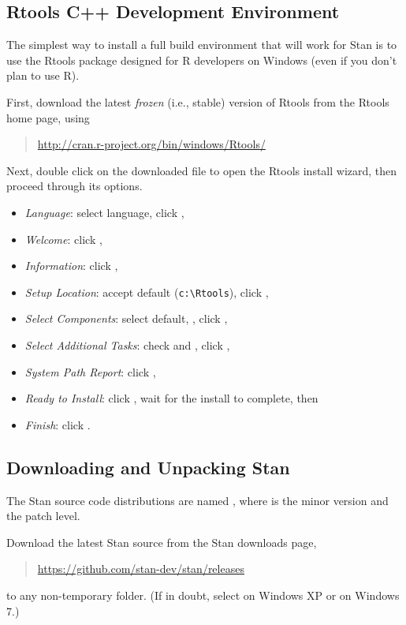 \subsection{Rtools C++ Development Environment}

The simplest way to install a full \Cpp build environment that will
work for Stan is to use the Rtools package designed for R developers
on Windows (even if you don't plan to use R).

First, download the latest \emph{frozen} (i.e., stable) version of
Rtools from the Rtools home page, using
%
\begin{quote}
\url{http://cran.r-project.org/bin/windows/Rtools/}
\end{quote}

Next, double click on the downloaded file to open the Rtools
install wizard, then proceed through its options.
\begin{itemize}
\item \emph{Language}: select language, click ,
\item \emph{Welcome}: click ,
\item \emph{Information}: click ,
\item \emph{Setup Location}: accept default (\verb|c:\Rtools|), click ,
\item \emph{Select Components}: select default, , click ,
\item \emph{Select Additional Tasks}: check  and , click ,
\item \emph{System Path Report}: click ,
\item \emph{Ready to Install}: click , wait for the
  install to complete, then
\item \emph{Finish}: click .
\end{itemize}

\subsection{Downloading and Unpacking Stan}

The Stan source code distributions are named
, where  is the minor version and
 the patch level.

Download the latest Stan source from the Stan downloads page,
%
\begin{quote}
\url{https://github.com/stan-dev/stan/releases}
\end{quote}
%
to any non-temporary folder.  (If in doubt, select 
on Windows XP or  on Windows 7.)  

